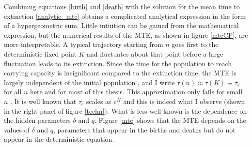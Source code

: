 Combining equations \ref{birth} and \ref{death} with the solution for the mean time to extinction \ref{analytic_mte} obtains a complicated analytical expression in the form of a hypergeometric sum. %
Little intuition can be gained from the mathematical expression, but the numerical results of the MTE, as shown in figure \ref{mteCP}, are more interpretable. 
A typical trajectory starting from $n$ goes first to the deterministic fixed point $K$ and fluctuates about that point before a large fluctuation leads to its extinction. 
Since the time for the population to reach carrying capacity is insignificant compared to the extinction time, the MTE is largely independent of the initial population \cite{Chotibut2015}, and I write $\tau(n) \approx \tau(K) \equiv \tau_e$ for all $n$ here and for most of this thesis. %
This approximation only fails for small $n$ \cite{Chotibut2015}. %
It is well known that $\tau_e$ scales as $e^K$ \cite{Lande1993,Ovaskainen2010} and this is indeed what I observe (shown in the right panel of figure \ref{techn}). %
What is less well known is the dependence on the hidden parameters $\delta$ and $q$. %
Figure \ref{mte} shows that the MTE depends on the values of $\delta$ and $q$, parameters that appear in the births and deaths but do not appear in the deterministic equation. %


